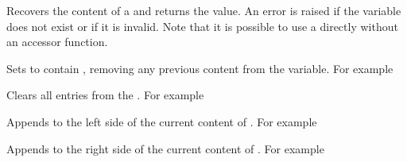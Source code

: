 \documentclass[oneside]{book}
\begin{document}
\begin{function}{\TlUse}
\begin{syntax}
 
\end{syntax}
Recovers the content of a  and returns the value.
An error is raised if the variable
does not exist or if it is invalid. Note that it is possible to use
a  directly without an accessor function.
\end{function}

\begin{function}{\TlSet}
\begin{syntax}
  
\end{syntax}
Sets  to contain ,
removing any previous content from the variable. For example
\begin{demo}
\TlSet{}
\TlUse\lTmpiTl
\end{demo}
\end{function}

\begin{function}{\TlClear}
\begin{syntax}
 
\end{syntax}
Clears all entries from the . For example
\begin{demo}
\TlSet{}
\TlClear\lTmpjTl
\TlSet{}
\TlUse\lTmpjTl
\end{demo}
\end{function}

\begin{function}{\TlPutLeft}
\begin{syntax}
  
\end{syntax}
Appends  to the left side of the current content of
. For example
\begin{demo}
\TlSet{}
\TlPutLeft{}
\TlUse\lTmpkTl
\end{demo}
\end{function}

\begin{function}{\TlPutRight}
\begin{syntax}
  
\end{syntax}
Appends  to the right side of the current content of
. For example
\begin{demo}
\TlSet{}
\TlPutRight{}
\TlUse\lTmpkTl
\end{demo}
\end{function}
\end{document}
